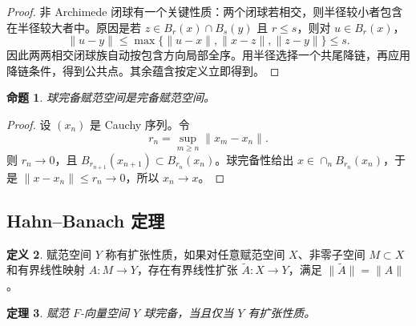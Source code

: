 \documentclass[11pt,a4paper,openany]{ctexbook}
\numberwithin{equation}{chapter}
\theoremstyle{plain}
\newtheorem{theorem}{定理}[chapter]
\newtheorem{proposition}[theorem]{命题}
\theoremstyle{definition}
\newtheorem{definition}[theorem]{定义}
\theoremstyle{remark}
\begin{document}
\begin{proof}
非 Archimede 闭球有一个关键性质：两个闭球若相交，则半径较小者包含在半径较大者中。原因是若 $z\in B_r(x)\cap B_s(y)$ 且 $r\le s$，则对 $u\in B_r(x)$，
\[
  \|u-y\|\le \max\{\|u-x\|,\|x-z\|,\|z-y\|\}\le s.
\]
因此两两相交闭球族自动按包含方向局部全序。用半径选择一个共尾降链，再应用降链条件，得到公共点。其余蕴含按定义立即得到。
\end{proof}

\begin{proposition}
球完备赋范空间是完备赋范空间。
\end{proposition}

\begin{proof}
设 $(x_n)$ 是 Cauchy 序列。令
\[
  r_n=\sup_{m\ge n}\|x_m-x_n\|.
\]
则 $r_n\to0$，且 $B_{r_{n+1}}(x_{n+1})\subset B_{r_n}(x_n)$。球完备性给出 $x\in\cap_nB_{r_n}(x_n)$，于是 $\|x-x_n\|\le r_n\to0$，所以 $x_n\to x$。
\end{proof}

\subsection{Hahn--Banach 定理}

\begin{definition}
赋范空间 $Y$ 称有扩张性质，如果对任意赋范空间 $X$、非零子空间 $M\subset X$ 和有界线性映射 $A:M\to Y$，存在有界线性扩张 $\widetilde A:X\to Y$，满足 $\|\widetilde A\|=\|A\|$。
\end{definition}

\begin{theorem}
赋范 $F$-向量空间 $Y$ 球完备，当且仅当 $Y$ 有扩张性质。
\end{theorem}
\end{document}
